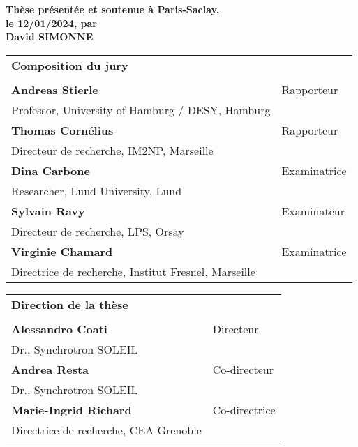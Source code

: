 \begin{titlepage}
\textbf{Thèse présentée et soutenue à Paris-Saclay,\\ le 12/01/2024, par}\\
\bigskip
\Large {\color{Prune} \textbf{David SIMONNE}}

\vspace{\fill} %

\bigskip
\flushleft
\scriptsize
\begin{tabular}{|p{7cm}l}
\arrayrulecolor{Prune}
{\footnotesize \textbf{Composition du jury}}\\
& \\
\textbf{Andreas Stierle} & Rapporteur \\
Professor, University of Hamburg / DESY, Hamburg & \\
\textbf{Thomas Cornélius} & Rapporteur \\
Directeur de recherche, IM2NP, Marseille & \\
\textbf{Dina Carbone} & Examinatrice \\
Researcher, Lund University, Lund & \\
\textbf{Sylvain Ravy} & Examinateur \\
Directeur de recherche, LPS, Orsay & \\
\textbf{Virginie Chamard} & Examinatrice \\
Directrice de recherche, Institut Fresnel, Marseille & \\

\end{tabular} 

\medskip
\begin{tabular}{|p{7cm}l}
\arrayrulecolor{Prune}
{\footnotesize \textbf{Direction de la thèse}}\\
& \\
\textbf{Alessandro Coati} & Directeur \\
Dr., Synchrotron SOLEIL & \\
\textbf{Andrea Resta} & Co-directeur \\
Dr., Synchrotron SOLEIL & \\
\textbf{Marie-Ingrid Richard} & Co-directrice \\
Directrice de recherche, CEA Grenoble & \\

\end{tabular} 

\end{titlepage}